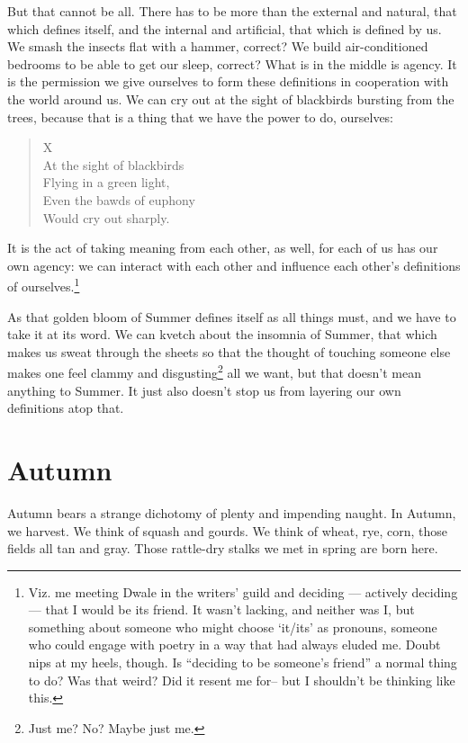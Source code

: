 \documentclass[12pt,oneside]{memoir}
\begin{document}
But that cannot be all. There has to be more than the external and natural, that which defines itself, and the internal and artificial, that which is defined by us. We smash the insects flat with a hammer, correct? We build air-conditioned bedrooms to be able to get our sleep, correct? What is in the middle is agency. It is the permission we give ourselves to form these definitions in cooperation with the world around us. We can cry out at the sight of blackbirds bursting from the trees, because that is a thing that we have the power to do, ourselves:

\begin{verse}
X \\
At the sight of blackbirds \\
Flying in a green light, \\
Even the bawds of euphony \\
Would cry out sharply.

\parencite{blackbird}
\end{verse}

It is the act of taking meaning from each other, as well, for each of us has our own agency: we can interact with each other and influence each other's definitions of ourselves.\footnote{Viz. me meeting Dwale in the writers' guild and deciding --- actively deciding --- that I would be its friend. It wasn't lacking, and neither was I, but something about someone who might choose `it/its' as pronouns, someone who could engage with poetry in a way that had always eluded me. Doubt nips at my heels, though. Is ``deciding to be someone's friend'' a normal thing to do? Was that weird? Did it resent me for-- but I shouldn't be thinking like this.}

As that golden bloom of Summer defines itself as all things must, and we have to take it at its word. We can kvetch about the insomnia of Summer, that which makes us sweat through the sheets so that the thought of touching someone else makes one feel clammy and disgusting\footnote{Just me? No? Maybe just me.} all we want, but that doesn't mean anything to Summer. It just also doesn't stop us from layering our own definitions atop that.


\section*{Autumn}

Autumn bears a strange dichotomy of plenty and impending naught. In Autumn, we harvest. We think of squash and gourds. We think of wheat, rye, corn, those fields all tan and gray. Those rattle-dry stalks we met in spring are born here.
\end{document}

